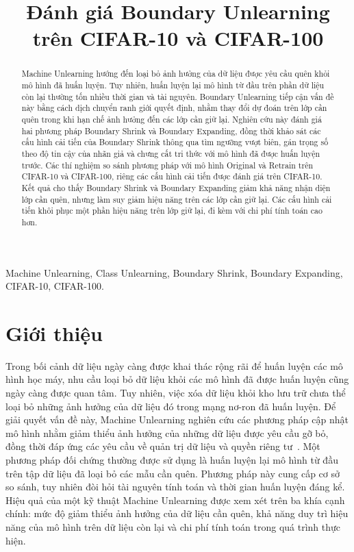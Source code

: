 \documentclass[conference]{IEEEtran}
\begin{document}
\title{Đánh giá Boundary Unlearning trên CIFAR-10 và CIFAR-100}
\author{
}
\maketitle
\begin{abstract}
Machine Unlearning hướng đến loại bỏ ảnh hưởng của dữ liệu được yêu cầu quên khỏi mô hình đã huấn luyện. Tuy nhiên, huấn luyện lại mô hình từ đầu trên phần dữ liệu còn lại thường tốn nhiều thời gian và tài nguyên. Boundary Unlearning tiếp cận vấn đề này bằng cách dịch chuyển ranh giới quyết định, nhằm thay đổi dự đoán trên lớp cần quên trong khi hạn chế ảnh hưởng đến các lớp cần giữ lại. Nghiên cứu này đánh giá hai phương pháp Boundary Shrink và Boundary Expanding, đồng thời khảo sát các cấu hình cải tiến của Boundary Shrink thông qua tìm ngưỡng vượt biên, gán trọng số theo độ tin cậy của nhãn giả và chưng cất tri thức với mô hình đã được huấn luyện trước. Các thí nghiệm so sánh phương pháp với mô hình Original và Retrain trên CIFAR-10 và CIFAR-100, riêng các cấu hình cải tiến được đánh giá trên CIFAR-10. Kết quả cho thấy Boundary Shrink và Boundary Expanding giảm khả năng nhận diện lớp cần quên, nhưng làm suy giảm hiệu năng trên các lớp cần giữ lại. Các cấu hình cải tiến khôi phục một phần hiệu năng trên lớp giữ lại, đi kèm với chi phí tính toán cao hơn.
\end{abstract}
\begin{IEEEkeywords}
Machine Unlearning, Class Unlearning, Boundary Shrink, Boundary Expanding, CIFAR-10, CIFAR-100.
\end{IEEEkeywords}

\section{Giới thiệu}
Trong bối cảnh dữ liệu ngày càng được khai thác rộng rãi để huấn luyện các mô hình học máy, nhu cầu loại bỏ dữ liệu khỏi các mô hình đã được huấn luyện cũng ngày càng được quan tâm. Tuy nhiên, việc xóa dữ liệu khỏi kho lưu trữ chưa thể loại bỏ những ảnh hưởng của dữ liệu đó trong mạng nơ-ron đã huấn luyện. Để giải quyết vấn đề này, Machine Unlearning nghiên cứu các phương pháp cập nhật mô hình nhằm giảm thiểu ảnh hưởng của những dữ liệu được yêu cầu gỡ bỏ, đồng thời đáp ứng các yêu cầu về quản trị dữ liệu và quyền riêng tư~\cite{bourtoule2021machine}. Một phương pháp đối chứng thường được sử dụng là huấn luyện lại mô hình từ đầu trên tập dữ liệu đã loại bỏ các mẫu cần quên. Phương pháp này cung cấp cơ sở so sánh, tuy nhiên đòi hỏi tài nguyên tính toán và thời gian huấn luyện đáng kể. Hiệu quả của một kỹ thuật Machine Unlearning được xem xét trên ba khía cạnh chính: mức độ giảm thiểu ảnh hưởng của dữ liệu cần quên, khả năng duy trì hiệu năng của mô hình trên dữ liệu còn lại và chi phí tính toán trong quá trình thực hiện.
\end{document}
